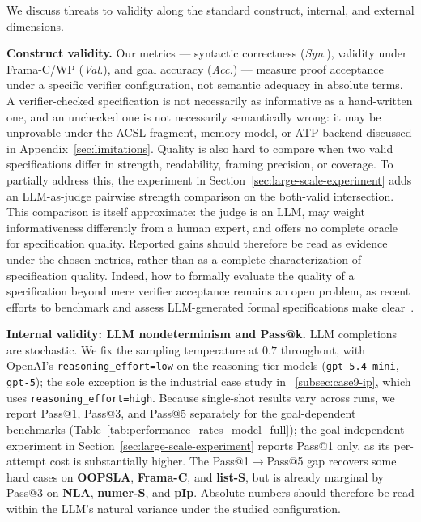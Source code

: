 We discuss threats to validity along the standard construct, internal, and
external dimensions.

\smallskip
\noindent\textbf{Construct validity.}
Our metrics --- syntactic correctness (\emph{Syn.}), validity under Frama-C/WP
(\emph{Val.}), and goal accuracy (\emph{Acc.}) --- measure proof acceptance
under a specific verifier configuration, not semantic adequacy in absolute
terms. A verifier-checked specification is not necessarily as informative as a
hand-written one, and an unchecked one is not necessarily semantically wrong: it
may be unprovable under the ACSL fragment, memory model, or ATP backend
discussed in Appendix~\ref{sec:limitations}. Quality is also hard to compare when
two valid specifications differ in strength, readability, framing precision, or
coverage. To partially address this, the experiment in
Section~\ref{sec:large-scale-experiment} adds an LLM-as-judge pairwise strength
comparison on the both-valid intersection. This comparison is itself
approximate: the judge is an LLM, may weight informativeness differently from a
human expert, and offers no complete oracle for specification quality. Reported
gains should therefore be read as evidence under the chosen metrics, rather than
as a complete characterization of specification quality. Indeed, how to
formally evaluate the quality of a specification beyond mere verifier
acceptance remains an open problem, as recent efforts to benchmark and assess
LLM-generated formal specifications make
clear~\cite{yang2026how,thakur2025clever}.

\smallskip
\noindent\textbf{Internal validity: LLM nondeterminism and Pass@k.}
LLM completions are stochastic. We fix the sampling temperature at $0.7$
throughout, with OpenAI's \texttt{reasoning\_effort=low} on the reasoning-tier
models (\texttt{gpt-5.4-mini}, \texttt{gpt-5}); the sole exception is the
industrial case study in ~\ref{subsec:case9-ip}, which uses
\texttt{reasoning\_effort=high}.
Because single-shot results vary across runs, we report Pass@1,
Pass@3, and Pass@5 separately for the goal-dependent benchmarks
(Table~\ref{tab:performance_rates_model_full}); the goal-independent
experiment in Section~\ref{sec:large-scale-experiment} reports Pass@1 only, as its
per-attempt cost is substantially higher. The Pass@1$\to$Pass@5 gap recovers
some hard cases on \textbf{OOPSLA}, \textbf{Frama-C}, and \textbf{list-S}, but is
already marginal by Pass@3 on \textbf{NLA}, \textbf{numer-S}, and \textbf{pIp}.
Absolute numbers
should therefore be read within the LLM's natural variance under the studied
configuration.

